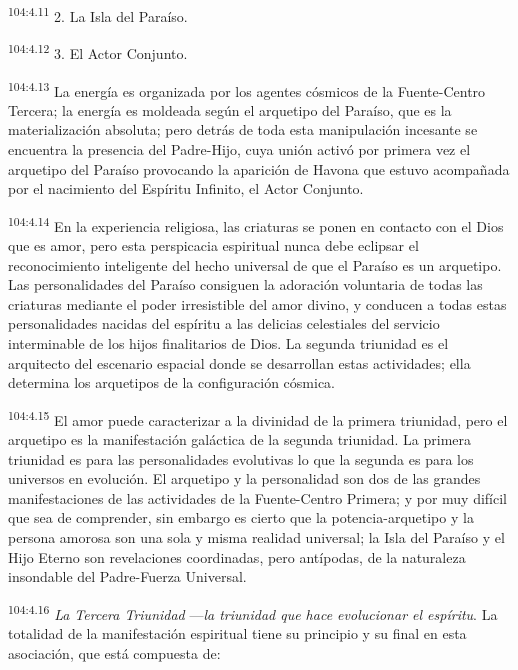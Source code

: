 \documentclass[twoside, 11pt]{book}
\begin{document}
\par
\textsuperscript{104:4.11} 2. La Isla del Paraíso.

\par
\textsuperscript{104:4.12} 3. El Actor Conjunto.

\par
\textsuperscript{104:4.13} La energía es organizada por los agentes cósmicos de la Fuente-Centro Tercera; la energía es moldeada según el arquetipo del Paraíso, que es la materialización absoluta; pero detrás de toda esta manipulación incesante se encuentra la presencia del Padre-Hijo, cuya unión activó por primera vez el arquetipo del Paraíso provocando la aparición de Havona que estuvo acompañada por el nacimiento del Espíritu Infinito, el Actor Conjunto.

\par
\textsuperscript{104:4.14} En la experiencia religiosa, las criaturas se ponen en contacto con el Dios que es amor, pero esta perspicacia espiritual nunca debe eclipsar el reconocimiento inteligente del hecho universal de que el Paraíso es un arquetipo. Las personalidades del Paraíso consiguen la adoración voluntaria de todas las criaturas mediante el poder irresistible del amor divino, y conducen a todas estas personalidades nacidas del espíritu a las delicias celestiales del servicio interminable de los hijos finalitarios de Dios. La segunda triunidad es el arquitecto del escenario espacial donde se desarrollan estas actividades; ella determina los arquetipos de la configuración cósmica.

\par
\textsuperscript{104:4.15} El amor puede caracterizar a la divinidad de la primera triunidad, pero el arquetipo es la manifestación galáctica de la segunda triunidad. La primera triunidad es para las personalidades evolutivas lo que la segunda es para los universos en evolución. El arquetipo y la personalidad son dos de las grandes manifestaciones de las actividades de la Fuente-Centro Primera; y por muy difícil que sea de comprender, sin embargo es cierto que la potencia-arquetipo y la persona amorosa son una sola y misma realidad universal; la Isla del Paraíso y el Hijo Eterno son revelaciones coordinadas, pero antípodas, de la naturaleza insondable del Padre-Fuerza Universal.

\par
\textsuperscript{104:4.16} \textit{La Tercera Triunidad} ---\textit{la triunidad que hace evolucionar el espíritu}. La totalidad de la manifestación espiritual tiene su principio y su final en esta asociación, que está compuesta de:
\end{document}
